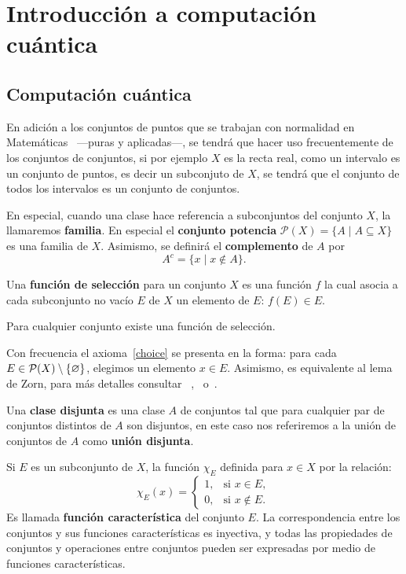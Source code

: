 \chapter{Introducción a computación cuántica}

\section{Computación cuántica}

En adición a los conjuntos de puntos que se trabajan con normalidad
en Matemáticas ~---puras y aplicadas---, se tendrá que hacer uso
frecuentemente de los conjuntos de conjuntos, si por ejemplo $X$ es
la recta real, como un intervalo es un conjunto de puntos, es decir
un subconjuto de $X$, se tendrá que el conjunto de todos los
intervalos es un conjunto de conjuntos.

En especial, cuando una clase hace referencia a subconjuntos del
conjunto $X$, la llamaremos \textbf{familia}. En especial el
\textbf{conjunto potencia} $\mathcal{P} (X)=\{A\mid A\subseteq X\}$
es una familia de $X$. Asimismo, se definirá el \textbf{complemento}
de $A$ por \[A^c=\{x\mid x\notin A\}.\]

\begin{defn}\label{dfcp28} Una \textbf{función de selección}
para un conjunto $X$ es una función $f$ la cual asocia a cada
subconjunto no vacío $E$ de $X$ un elemento de $E$: $f(E)\in E$.
\end{defn}

\begin{axm}[de selección]\label{choice} Para cualquier conjunto
existe una función de selección.
\end{axm}

\begin{rem} Con frecuencia el axioma~\ref{choice} se presenta en
la forma: para cada $E\in \mathcal{P}(X)\setminus\{\varnothing\}$,
elegimos un elemento $x\in E$. Asimismo, es equivalente al lema de
Zorn, para más detalles consultar
~\cite[p. 97]{Halmo},~\cite[p. 338]{Haus} o~\cite[p. 14]{Hewit}.
\end{rem}

Una \textbf{clase disjunta} es una clase {\boldmath $A$} de
conjuntos tal que para cualquier par de conjuntos distintos de
{\boldmath $A$} son disjuntos, en este caso nos referiremos a la
unión de conjuntos de {\boldmath $A$} como \textbf{unión disjunta}.

Si $E$ es un subconjunto de $X$, la función $\chi _E$ definida para
$x\in X$ por la relación:
\begin{equation}\label{eq0}
    \chi_E(x)= \begin{cases}
    1, & \mbox{si } x\in E, \\
    0, & \mbox{si } x\notin E.
    \end{cases}
\end{equation}Es llamada \textbf{función característica}
del conjunto $E$. La correspondencia entre los conjuntos y sus
funciones características es inyectiva, y todas las propiedades de
conjuntos y operaciones entre conjuntos pueden ser expresadas por
medio de funciones características. 

